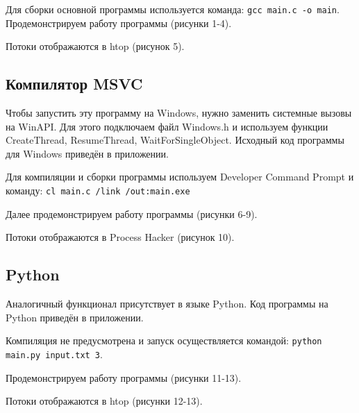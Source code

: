 Для сборки основной программы используется команда: \texttt{gcc main.c -o main}. 
Продемонстрируем работу программы (рисунки 1-4).

\FloatBarrier

Потоки отображаются в htop (рисунок 5). 

\FloatBarrier
\clearpage


\subsection{Компилятор MSVC}

Чтобы запустить эту программу на Windows, нужно заменить системные вызовы на WinAPI. Для этого подключаем файл Windows.h и используем функции CreateThread, ResumeThread, WaitForSingleObject. Исходный код программы для Windows приведён в приложении.

Для компиляции и сборки программы используем Developer Command Prompt и команду: \texttt{cl main.c /link /out:main.exe}

Далее продемонстрируем работу программы (рисунки 6-9).

\FloatBarrier

Потоки отображаются в Process Hacker (рисунок 10).

\FloatBarrier
\clearpage


\subsection{Python}

Аналогичный функционал присутствует в языке Python. Код программы на Python приведён в приложении. 

Компиляция не предусмотрена и запуск осуществляется командой: \texttt{python main.py input.txt 3}.

Продемонстрируем работу программы (рисунки 11-13).

\FloatBarrier

Потоки отображаются в htop (рисунки 12-13).

